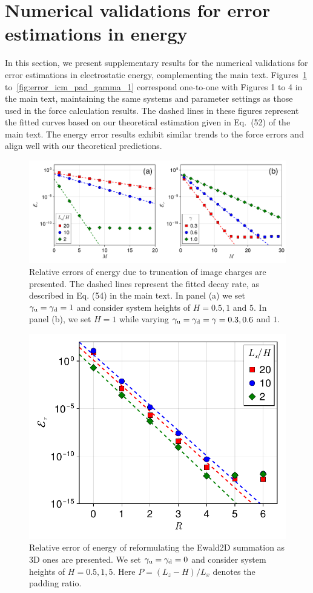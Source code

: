 \section{Numerical validations for error estimations in energy}\label{sec:numeric_energy}

In this section, we present supplementary results for the numerical validations for error estimations in electrostatic energy, complementing the main text. Figures~\ref{fig:icm_error} to~\ref{fig:error_icm_pad_gamma_1} correspond one-to-one with Figures 1 to 4 in the main text, maintaining the same systems and parameter settings as those used in the force calculation results. The dashed lines in these figures represent the fitted curves based on our theoretical estimation given in Eq.~(52) of the main text. The energy error results exhibit similar trends to the force errors and align well with our theoretical predictions.


\begin{figure}[htbp]
    \centering
    \includegraphics[width=0.98\linewidth]{figs/icm_error.pdf}
    \caption{
        Relative errors of energy due to truncation of image charges are presented. The dashed lines represent the fitted decay rate, as described in Eq. (54) in the main text. In panel (a) we set $\gamma_{\text{u}} = \gamma_{\text{d}} = 1$ and consider system heights of $H = 0.5, 1$ and $5$. In panel (b), we set $H = 1$ while varying $\gamma_{\text{u}} = \gamma_{\text{d}} = \gamma = 0.3, 0.6$ and $1$. 
    }
    \label{fig:icm_error}
\end{figure}


\begin{figure}[htbp]
    \centering
    \includegraphics[width=0.49\linewidth]{figs/elc_error.pdf}
    \caption{Relative error of energy of reformulating the Ewald2D summation as 3D ones are presented. We set $\gamma_{\text{u}} = \gamma_{\text{d}} = 0$ and consider system heights of $H = 0.5, 1, 5$. Here $P = (L_z - H) / L_x$ denotes the padding ratio.}
    \label{fig:elc_error}
\end{figure}

